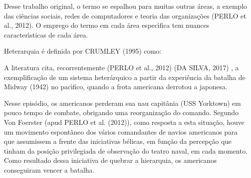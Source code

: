 \documentclass[
12pt,		%
openright,	%
twoside,  %
a4paper,			%
chapter=TITLE,		%
english,			%
french,				%
spanish,			%
brazil				%
]{USPSC-classe/USPSC}
\begin{document}
Desse trabalho original, o termo se espalhou para muitas outras \'areas, a exemplo das ci\^encias sociais, redes de computadores e teoria das organiza\c{c}\~oes  (PERLO et al., 2012). O emprego do termo em cada \'area espec\'{\i}fica tem nuances caracter\'{\i}sticas de cada \'area.

















Heterarquia \'e definida por  CRUMLEY (1995) como:


















\noindent\begin{center}\mbox{\centering{}}\end{center}


A literatura cita, recorrentemente  (PERLO et al., 2012) (DA SILVA, 2017) , a exemplifica\c{c}\~ao de um sistema heter\'arquico a partir da experi\^encia da batalha de Midway (1942) no pac\'{\i}fico, quando a frota americana derrotou a japonesa.

















Nesse epis\'odio, os americanos perderam sua nau capit\^ania (USS Yorktown) em pouco tempo de combate, obrigando uma reorganiza\c{c}\~ao do comando. Segundo Von Foerster (apud  PERLO et al. (2012)), como resposta a esta situa\c{c}\~ao, houve um movimento espont\^aneo dos v\'arios comandantes de navios americanos para que assumissem a frente das iniciativas b\'elicas, em fun\c{c}\~ao da percep\c{c}\~ao que tinham da posi\c{c}\~ao privilegiada de observa\c{c}\~ao do teatro naval, em cada momento. Como resultado dessa iniciativa de \textquotedbl quebrar a hierarquia\textquotedbl , os americanos conseguiram vencer a batalha.
\end{document}
